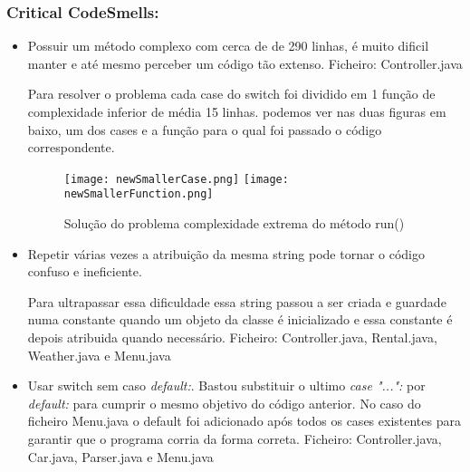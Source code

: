 \subsubsection{Critical CodeSmells:}
\begin{itemize}
\item Possuir um método complexo com cerca de de 290 linhas, é muito dificil manter e até mesmo perceber um código tão extenso.\newline
 Ficheiro: Controller.java\newline

\par Para resolver o problema cada case do switch foi dividido em 1 função de complexidade inferior de média 15 linhas. podemos ver nas duas figuras em baixo, um dos cases e a função para o qual foi passado o código correspondente.

\begin{figure}[H]

  \centering

  \texttt{[image: newSmallerCase.png]}
  \texttt{[image: newSmallerFunction.png]}

  \caption {Solução do problema complexidade extrema do método run()}

  \label {fig10}

\end{figure}
\end{itemize}

\begin{itemize}
\item Repetir várias vezes a atribuição da mesma string pode tornar o código confuso e ineficiente. \newline
\par Para ultrapassar essa dificuldade essa string passou a ser criada e guardade numa constante quando um objeto da classe é inicializado e essa constante é depois atribuida quando necessário. \newline
 Ficheiro: Controller.java, Rental.java, Weather.java e Menu.java\newline
\end{itemize}

\begin{itemize}
\item Usar switch sem caso \textit{default:}. Bastou substituir o ultimo \textit{case "...":} por \textit{default:} para cumprir o mesmo objetivo do código anterior. No caso do ficheiro Menu.java o default foi adicionado após todos os cases existentes para garantir que o programa corria da forma correta.
 Ficheiro: Controller.java, Car.java, Parser.java e Menu.java\newline
\end{itemize}

